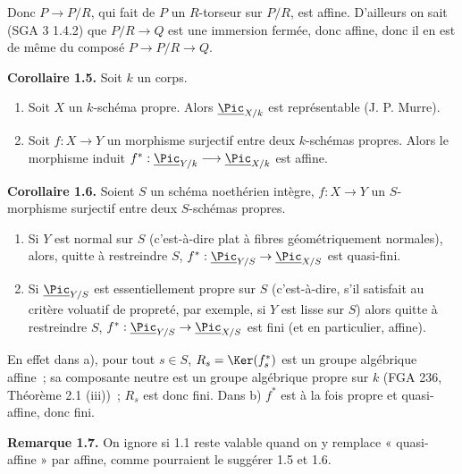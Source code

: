 Donc \(P\to P/R\), qui fait de \(P\) un \(R\)-torseur sur \(P/R\), est affine. D'ailleurs on sait (SGA 3 1.4.2) que \(P/R\to Q\) est une immersion fermée, donc affine, donc il en est de même du composé \(P\to P/R\to Q\).

\textbf{Corollaire 1.5.} Soit \(k\) un corps.
\begin{enumerate}[label=\alph*)]
\item Soit \(X\) un \(k\)-schéma propre. Alors \(\underline{\Pic}_{X/k}\) est représentable (J. P. Murre).
\item Soit \(f:X\to Y\) un morphisme surjectif entre deux \(k\)-schémas propres. Alors le morphisme induit \(f^*:\underline{\Pic}_{Y/k}\longrightarrow \underline{\Pic}_{X/k}\) est affine.
\end{enumerate}

\textbf{Corollaire 1.6.} Soient \(S\) un schéma noethérien intègre, \(f:X\to Y\) un \(S\)-morphisme surjectif entre deux \(S\)-schémas propres.
\begin{enumerate}[label=\alph*)]
\item Si \(Y\) est normal sur \(S\) (c'est-à-dire plat à fibres géométriquement normales), alors, quitte à restreindre \(S\), \(f^*:\underline{\Pic}_{Y/S}\to\underline{\Pic}_{X/S}\) est quasi-fini.
\item Si \(\underline{\Pic}_{Y/S}\) est essentiellement propre sur \(S\) (c'est-à-dire, s'il satisfait au critère voluatif de propreté, par exemple, si \(Y\) est lisse sur \(S\)) alors quitte à restreindre \(S\), \(f^*:\underline{\Pic}_{Y/S}\to\underline{\Pic}_{X/S}\) est fini (et en particulier, affine).
\end{enumerate}

En effet dans a), pour tout \(s\in S\), \(R_s=\Ker(f_s^*)\) est un groupe algébrique affine~; sa composante neutre est un groupe algébrique propre sur \(k\) (FGA 236, Théorème 2.1 (iii))~; \(R_s\) est donc fini. Dans b) \(f^*\) est à la fois propre et quasi-affine, donc fini.

\textbf{Remarque 1.7.} On ignore si 1.1 reste valable quand on y remplace « quasi-affine » par affine, comme pourraient le suggérer 1.5 et 1.6.

